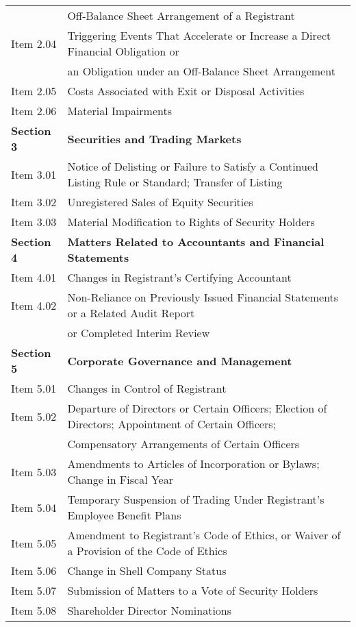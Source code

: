 \begin{table}[H]
\begin{small}
\begin{tabular}{ll}
              & Off-Balance Sheet Arrangement of a Registrant \\
    Item 2.04 & Triggering Events That Accelerate or Increase a Direct Financial Obligation or \\
              & an Obligation under an Off-Balance Sheet Arrangement \\
    Item 2.05 & Costs Associated with Exit or Disposal Activities \\
    Item 2.06 & Material Impairments \\
    \textbf{Section 3} & \textbf{Securities and Trading Markets} \\
    Item 3.01 & Notice of Delisting or Failure to Satisfy a Continued Listing Rule or Standard; Transfer of Listing \\
    Item 3.02 & Unregistered Sales of Equity Securities \\
    Item 3.03 & Material Modification to Rights of Security Holders \\
    \textbf{Section 4} & \textbf{Matters Related to Accountants and Financial Statements} \\
    Item 4.01 & Changes in Registrant's Certifying Accountant \\
    Item 4.02 & Non-Reliance on Previously Issued Financial Statements or a Related Audit Report \\
              & or Completed Interim Review \\
    \textbf{Section 5} & \textbf{Corporate Governance and Management} \\
    Item 5.01 & Changes in Control of Registrant \\
    Item 5.02 & Departure of Directors or Certain Officers; Election of Directors; Appointment of Certain Officers; \\
              & Compensatory Arrangements of Certain Officers \\
    Item 5.03 & Amendments to Articles of Incorporation or Bylaws; Change in Fiscal Year \\
    Item 5.04 & Temporary Suspension of Trading Under Registrant's Employee Benefit Plans \\
    Item 5.05 & Amendment to Registrant's Code of Ethics, or Waiver of a Provision of the Code of Ethics \\
    Item 5.06 & Change in Shell Company Status \\
    Item 5.07 & Submission of Matters to a Vote of Security Holders \\
    Item 5.08 & Shareholder Director Nominations \\

\end{tabular}
\end{small}
\end{table}
